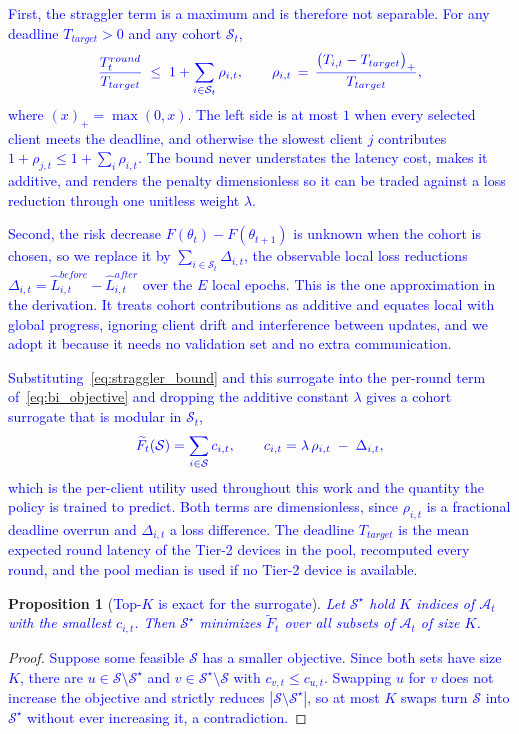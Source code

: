 \documentclass[journal]{IEEEtran}
\newtheorem{proposition}{Proposition}
\theoremstyle{remark}
\newcommand{\revtwo}[1]{\textcolor{blue}{#1}}
\newcommand{\revtwoeq}{\color{blue}}
\begin{document}
\revtwo{First, the straggler term is a maximum and is therefore not separable. For any deadline $T_{target}>0$ and any cohort $\mathcal{S}_t$,}
\begin{equation}
	\revtwoeq \frac{T_t^{round}}{T_{target}}\;\le\;1+\sum_{i\in\mathcal{S}_t}\rho_{i,t},\qquad
	\rho_{i,t}\,=\,\frac{\bigl(T_{i,t}-T_{target}\bigr)_{+}}{T_{target}},
	\label{eq:straggler_bound}
\end{equation}
\revtwo{where $(x)_+=\max(0,x)$. The left side is at most $1$ when every selected client meets the deadline, and otherwise the slowest client $j$ contributes $1+\rho_{j,t}\le 1+\sum_i\rho_{i,t}$. The bound never understates the latency cost, makes it additive, and renders the penalty dimensionless so it can be traded against a loss reduction through one unitless weight $\lambda$.}

\revtwo{Second, the risk decrease $F(\theta_t)-F(\theta_{t+1})$ is unknown when the cohort is chosen, so we replace it by $\sum_{i\in\mathcal{S}_t}\Delta_{i,t}$, the observable local loss reductions $\Delta_{i,t}=\hat{L}^{before}_{i,t}-\hat{L}^{after}_{i,t}$ over the $E$ local epochs. This is the one approximation in the derivation. It treats cohort contributions as additive and equates local with global progress, ignoring client drift and interference between updates, and we adopt it because it needs no validation set and no extra communication.}

\revtwo{Substituting~\eqref{eq:straggler_bound} and this surrogate into the per-round term of~\eqref{eq:bi_objective} and dropping the additive constant $\lambda$ gives a cohort surrogate that is modular in $\mathcal{S}_t$,}
\begin{equation}
	\revtwoeq \widetilde{F}_t(\mathcal{S})=\sum_{i\in\mathcal{S}}c_{i,t},\qquad
	c_{i,t}=\lambda\,\rho_{i,t}\;-\;\Delta_{i,t} ,
	\label{eq:cost}
\end{equation}
\revtwo{which is the per-client utility used throughout this work and the quantity the policy is trained to predict. Both terms are dimensionless, since $\rho_{i,t}$ is a fractional deadline overrun and $\Delta_{i,t}$ a loss difference. The deadline $T_{target}$ is the mean expected round latency of the Tier-2 devices in the pool, recomputed every round, and the pool median is used if no Tier-2 device is available.}

\begin{proposition}[\revtwo{Top-$K$ is exact for the surrogate}]\label{prop:topk}
\revtwo{Let $\mathcal{S}^\star$ hold $K$ indices of $\mathcal{A}_t$ with the smallest $c_{i,t}$. Then $\mathcal{S}^\star$ minimizes $\widetilde{F}_t$ over all subsets of $\mathcal{A}_t$ of size $K$.}
\end{proposition}
\begin{proof}
\revtwo{Suppose some feasible $\mathcal{S}$ has a smaller objective. Since both sets have size $K$, there are $u\in\mathcal{S}\setminus\mathcal{S}^\star$ and $v\in\mathcal{S}^\star\setminus\mathcal{S}$ with $c_{v,t}\le c_{u,t}$. Swapping $u$ for $v$ does not increase the objective and strictly reduces $|\mathcal{S}\setminus\mathcal{S}^\star|$, so at most $K$ swaps turn $\mathcal{S}$ into $\mathcal{S}^\star$ without ever increasing it, a contradiction.}
\end{proof}
\end{document}
